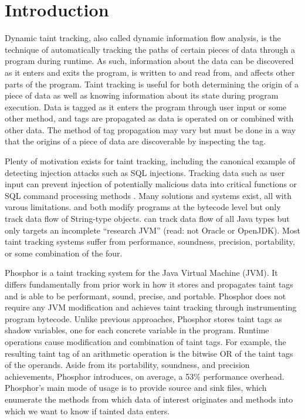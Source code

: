 \chapter{Introduction}

Dynamic taint tracking, also called dynamic information flow analysis, is the technique of automatically tracking the paths of certain pieces of data through a program during runtime. As such, information about the data can be discovered as it enters and exits the program, is written to and read from, and affects other parts of the program. Taint tracking is useful for both determining the origin of a piece of data as well as knowing information about its state during program execution. Data is tagged as it enters the program through user input or some other method, and tags are propagated as data is operated on or combined with other data. The method of tag propagation may vary but must be done in a way that the origins of a piece of data are discoverable by inspecting the tag.

Plenty of motivation exists for taint tracking, including the canonical example of detecting injection attacks such as SQL injections. Tracking data such as user input can prevent injection of potentially malicious data into critical functions or SQL command processing methods \cite{sql1} \cite{sql2}. Many solutions and systems exist, all with varous limitations. \cite{stringtaint} and \cite{sql1} both modify programs at the bytecode level but only track data flow of String-type objects. \cite{jikes} can track data flow of all Java types but only targets an incomplete ``research JVM'' (read: not Oracle or OpenJDK).  Most taint tracking systems suffer from performance, soundness, precision, portability, or some combination of the four. 

Phosphor \cite{phosphor_oopsla} is a taint tracking system for the Java Virtual Machine (JVM). It differs fundamentally from prior work in how it stores and propagates taint tags and is able to be performant, sound, precise, and portable. Phosphor does not require any JVM modification and achieves taint tracking through instrumenting program bytecode. Unlike previous approaches, Phosphor stores taint tags as shadow variables, one for each concrete variable in the program. Runtime operations cause modification and combination of taint tags. For example, the resulting taint tag of an arithmetic operation is the bitwise OR of the taint tags of the operands. Aside from its portability, soundness, and precision achievements, Phosphor introduces, on average, a 53\% performance overhead. Phosphor's main mode of usage is to provide source and sink files, which enumerate the methods from which data of interest originates and methods into which we want to know if tainted data enters. 

